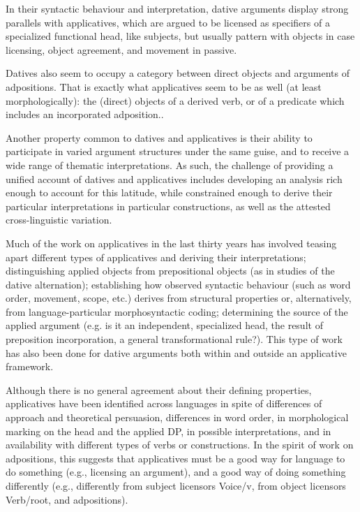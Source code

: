 \documentclass[output=paper,colorlinks,citecolor=brown,nonflat]{./langscibook}
\begin{document}
In their syntactic behaviour and interpretation, dative arguments display strong parallels with applicatives, which are argued to be licensed as specifiers of a specialized functional head, like subjects, but usually pattern with objects in case licensing, object agreement, and movement in passive.

Datives also seem to occupy a category between direct objects and arguments of adpositions. That is exactly what applicatives seem to be as well (at least morphologically): the (direct) objects of a derived verb, or of a predicate which includes an incorporated adposition.. 

Another property common to datives and applicatives is their ability to participate in varied argument structures under the same guise, and to receive a wide range of thematic interpretations. As such, the challenge of providing a unified account of datives and applicatives includes developing an analysis rich enough to account for this latitude, while constrained enough to derive their particular interpretations in particular constructions, as well as the attested cross-linguistic variation.  

Much of the work on applicatives in the last thirty years has involved teasing apart different types of applicatives and deriving their interpretations; distinguishing applied objects from prepositional objects (as in studies of the dative alternation); establishing how observed syntactic behaviour (such as word order, movement, scope, etc.) derives from structural properties or, alternatively, from language-particular morphosyntactic coding; determining the source of the applied argument (e.g. is it an independent, specialized head, the result of preposition incorporation, a general transformational rule?). This type of work has also been done for dative arguments both within and outside an applicative framework. 

Although there is no general agreement about their defining properties, applicatives have been identified across languages in spite of differences of approach and theoretical persuasion, differences in word order, in morphological marking on the head and the applied DP, in possible interpretations, and in availability with different types of verbs or constructions. In the spirit of  work on adpositions, this suggests that applicatives must be a good way for language to do something (e.g., licensing an argument), and a good way of doing something differently (e.g., differently from subject licensors Voice/v, from object licensors Verb/root, and adpositions).
\end{document}
